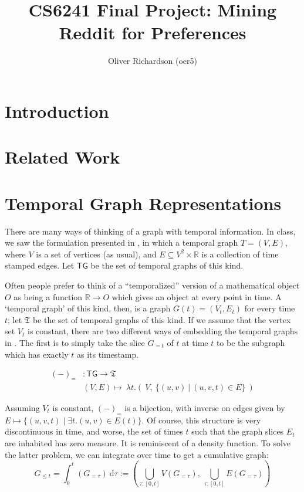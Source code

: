 \documentclass{article}
\author{Oliver Richardson (oer5)}
\title{CS6241 Final Project: Mining Reddit for Preferences}
\theoremstyle{definition}
\begin{document}
	\maketitle
	
	\section{Introduction}
	
	
	\section{Related Work}
	
	\section{Temporal Graph Representations}
	There are many ways of thinking of a graph with temporal information. In class, we saw the formulation presented in \cite{paranjape2017motifs}, in which a temporal graph $T = (V, E)$, where $V$ is a set of vertices (as usual), and $E \subseteq V^2 \times  \mathbb R$ is a collection of time stamped edges. Let $\mathsf{TG}$ be the set of temporal graphs of this kind.
	
	Often people prefer to think of a ``temporalized'' version of a mathematical object $O$ as being a function $\mathbb R \to O$ which gives an object at every point in time. A `temporal graph' of this kind, then, is a graph $G(t) = (V_t, E_t)$ for every time $t$; let $\mathfrak{T}$ be the set of temporal graphs of this kind. If we assume that the vertex set $V_t$ is constant, there are two different ways of embedding the temporal graphs in \cite{paranjape2017motifs}. The first is to simply take the slice $G_{=t}$ of $t$ at time $t$ to be the subgraph which has exactly $t$ as its timestamp.
	
	\begin{align*}
		(-)_{=}&: \mathsf{TG} \to \mathfrak T \\
		&(V, E) \mapsto ~\lambda t.\left( ~V,~\Big\{ (u,v)~\Big|~(u,v,t)\in E \Big\}~\right)
	\end{align*}
	
	Assuming $V_t$ is constant, $(-)_=$ is a bijection, with inverse on edges given by $E \mapsto \{ (u,v,t) \mid \exists t. (u,v) \in E(t) \}$. Of course, this structure is very discontinuous in time, and worse, the set of times $t$ such that the graph slices $E_t$ are inhabited has zero measure. It is reminiscent of a density function. To solve the latter problem, we can integrate over time to get a cumulative graph:
	\[ G_{\leq t} =  \int_0^t (G_{=\tau} )~\mathrm d \tau :=
		 \left( \bigcup_{\tau : [0,t]} V(G_{=\tau}), ~\bigcup_{\tau : [0,t]} E(G_{=\tau}) \right)\]
	
\end{document}
